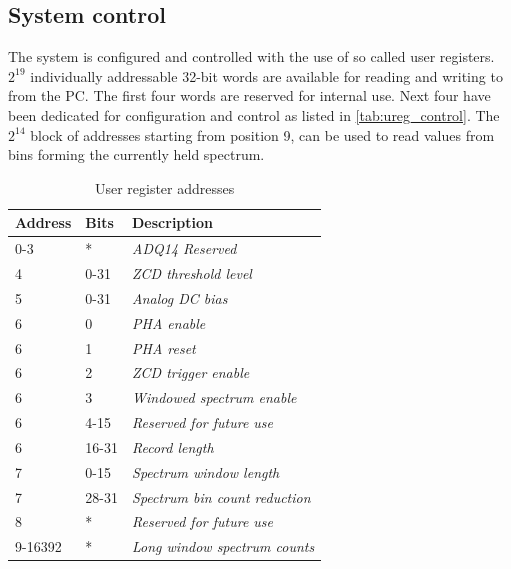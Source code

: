 \subsection{System control}

The system is configured and controlled with the use of so called 
user registers. $2^{19}$ individually addressable 32-bit words
are available for reading and writing to from the PC. The first
four words are reserved for internal use. Next four have been 
dedicated for configuration and control as listed in \autoref{tab:ureg_control}.
The $2^{14}$ block of addresses starting from position 9, can
be used to read values from bins forming the currently held spectrum.

\begin{table}[H]
\caption{User register addresses}
\centering
  \begin{tabular}{l | l | l}
  {\bfseries Address} & {\bfseries Bits} & {\bfseries Description}\\
  \hline
  0-3  & *      & \textit {ADQ14 Reserved}\\ \hline
  4    & 0-31       & \textit {ZCD threshold level}\\ \hline
  5    & 0-31       & \textit {Analog DC bias}\\ \hline
  6    & 0       & \textit {PHA enable}\\ \hline
  6    & 1       & \textit {PHA reset}\\ \hline
  6    & 2       & \textit {ZCD trigger enable}\\ \hline
  6    & 3       & \textit {Windowed spectrum enable}\\ \hline
  6    & 4-15  & \textit {Reserved for future use}\\ \hline
  6    & 16-31   & \textit {Record length}\\ \hline
  7    & 0-15   & \textit {Spectrum window length}\\ \hline
  7    & 28-31   & \textit {Spectrum bin count reduction}\\ \hline
  8    & *  & \textit {Reserved for future use}\\ \hline
  9-16392    & *   & \textit {Long window spectrum counts}\\ 
  \end{tabular}
  \label{tab:ureg_control}
\end{table}

